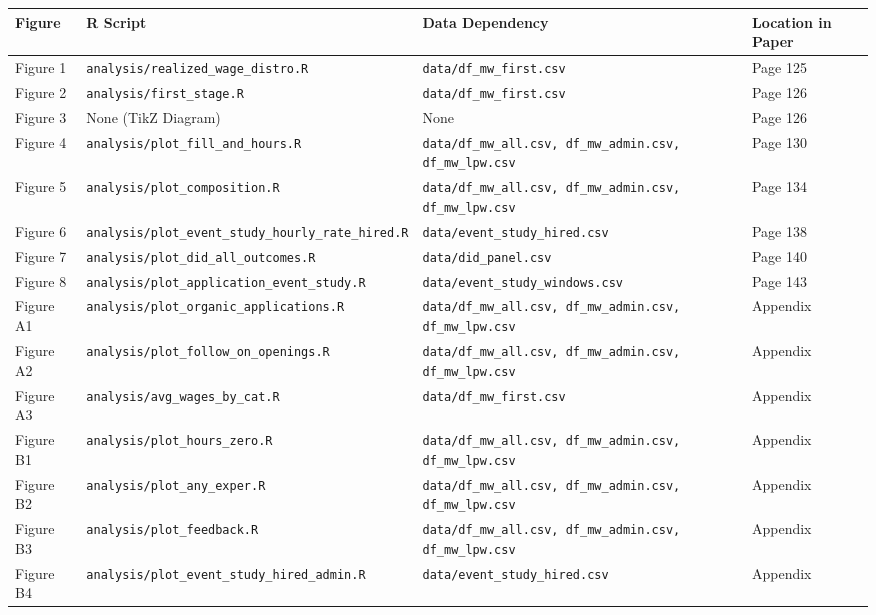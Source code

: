 \documentclass[10pt]{article}
\newenvironment{eightpt}{\begingroup\fontsize{8}{13}\selectfont}{\endgroup}
\begin{document}
\begin{eightpt}
\begin{tabularx}{\textwidth}{@{}p{}p{}p{}>{\centering\arraybackslash}p{}@{}}
\toprule
Figure & R Script & Data Dependency & Location in Paper \\
\midrule
Figure 1 & \texttt{analysis/realized\_wage\_distro.R} & \texttt{data/df\_mw\_first.csv} & Page 125 \\
Figure 2 & \texttt{analysis/first\_stage.R} & \texttt{data/df\_mw\_first.csv} & Page 126 \\
Figure 3 & None (TikZ Diagram) & None & Page 126 \\
Figure 4 & \texttt{analysis/plot\_fill\_and\_hours.R} & \texttt{data/df\_mw\_all.csv, df\_mw\_admin.csv, df\_mw\_lpw.csv} & Page 130 \\
Figure 5 & \texttt{analysis/plot\_composition.R} & \texttt{data/df\_mw\_all.csv, df\_mw\_admin.csv, df\_mw\_lpw.csv} & Page 134 \\
Figure 6 & \texttt{analysis/plot\_event\_study\_hourly\_rate\_hired.R} & \texttt{data/event\_study\_hired.csv} & Page 138 \\
Figure 7 & \texttt{analysis/plot\_did\_all\_outcomes.R} & \texttt{data/did\_panel.csv} & Page 140 \\
Figure 8 & \texttt{analysis/plot\_application\_event\_study.R} & \texttt{data/event\_study\_windows.csv} & Page 143 \\
Figure A1 & \texttt{analysis/plot\_organic\_applications.R} & \texttt{data/df\_mw\_all.csv, df\_mw\_admin.csv, df\_mw\_lpw.csv} & Appendix \\
Figure A2 & \texttt{analysis/plot\_follow\_on\_openings.R} & \texttt{data/df\_mw\_all.csv, df\_mw\_admin.csv, df\_mw\_lpw.csv} & Appendix \\
Figure A3 & \texttt{analysis/avg\_wages\_by\_cat.R} & \texttt{data/df\_mw\_first.csv} & Appendix \\
Figure B1 & \texttt{analysis/plot\_hours\_zero.R} & \texttt{data/df\_mw\_all.csv, df\_mw\_admin.csv, df\_mw\_lpw.csv} & Appendix \\
Figure B2 & \texttt{analysis/plot\_any\_exper.R} & \texttt{data/df\_mw\_all.csv, df\_mw\_admin.csv, df\_mw\_lpw.csv} & Appendix \\
Figure B3 & \texttt{analysis/plot\_feedback.R} & \texttt{data/df\_mw\_all.csv, df\_mw\_admin.csv, df\_mw\_lpw.csv} & Appendix \\
Figure B4 & \texttt{analysis/plot\_event\_study\_hired\_admin.R} & \texttt{data/event\_study\_hired.csv} & Appendix \\
\bottomrule
\end{tabularx}
\end{eightpt}
\end{document}
